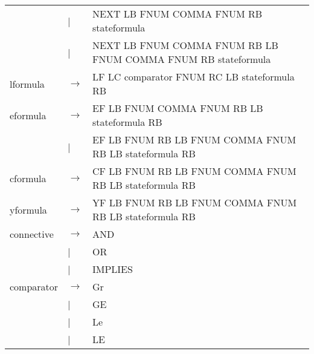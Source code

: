 \begin{table}[!ht]
\begin{center}
\begin{tiny}
\begin{tabular}{||lll||}
& | & NEXT LB FNUM COMMA FNUM RB stateformula \\
& | & NEXT LB FNUM COMMA FNUM RB LB FNUM COMMA FNUM RB stateformula \\
\hline lformula & $\longrightarrow$ & LF LC comparator FNUM RC LB stateformula RB \\
\hline eformula & $\longrightarrow$ & EF LB FNUM COMMA FNUM RB LB stateformula RB \\
& | & EF LB FNUM RB LB FNUM COMMA FNUM RB LB stateformula RB \\
\hline cformula & $\longrightarrow$ & CF LB FNUM RB LB FNUM COMMA FNUM RB LB stateformula RB \\
\hline yformula & $\longrightarrow$ & YF LB FNUM RB LB FNUM COMMA FNUM RB LB stateformula RB \\
\hline connective & $\longrightarrow$ & AND \\
& | & OR \\
& | & IMPLIES \\
\hline comparator & $\longrightarrow$ & Gr \\
& | & GE \\
& | & Le \\
& | & LE \\
\hline \hline
\end{tabular}
\end{tiny}
\end{center}
\label{Tbl:parser}
\end{table}
